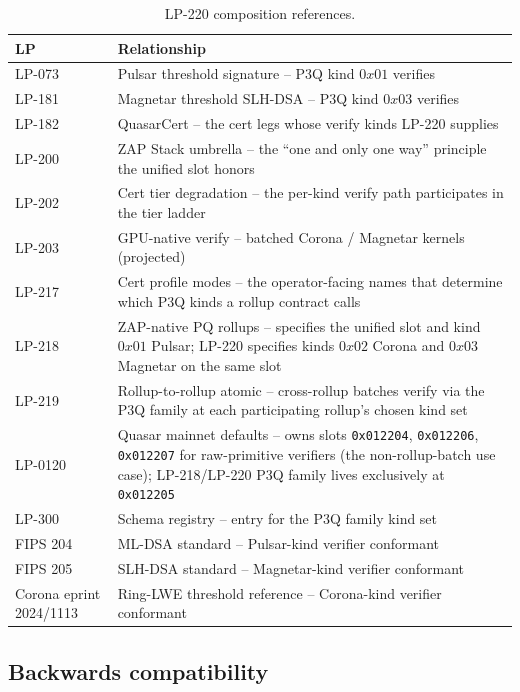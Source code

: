 \begin{table}[h]
\centering
\small
\begin{tabular}{@{}lp{9cm}@{}}
\toprule
\textbf{LP} & \textbf{Relationship} \\
\midrule
LP-073 & Pulsar threshold signature -- P3Q kind $0x01$ verifies \\
LP-181 & Magnetar threshold SLH-DSA -- P3Q kind $0x03$ verifies \\
LP-182 & QuasarCert -- the cert legs whose verify kinds LP-220 supplies \\
LP-200 & ZAP Stack umbrella -- the ``one and only one way'' principle the unified slot honors \\
LP-202 & Cert tier degradation -- the per-kind verify path participates in the tier ladder \\
LP-203 & GPU-native verify -- batched Corona / Magnetar kernels (projected) \\
LP-217 & Cert profile modes -- the operator-facing names that determine which P3Q kinds a rollup contract calls \\
LP-218 & ZAP-native PQ rollups -- specifies the unified slot and kind $0x01$ Pulsar; LP-220 specifies kinds $0x02$ Corona and $0x03$ Magnetar on the same slot \\
LP-219 & Rollup-to-rollup atomic -- cross-rollup batches verify via the P3Q family at each participating rollup's chosen kind set \\
LP-0120 & Quasar mainnet defaults -- owns slots \texttt{0x012204},
  \texttt{0x012206}, \texttt{0x012207} for raw-primitive verifiers
  (the non-rollup-batch use case); LP-218/LP-220 P3Q family
  lives exclusively at \texttt{0x012205} \\
LP-300 & Schema registry -- entry for the P3Q family kind set \\
FIPS 204 & ML-DSA standard -- Pulsar-kind verifier conformant \\
FIPS 205 & SLH-DSA standard -- Magnetar-kind verifier conformant \\
Corona eprint 2024/1113 & Ring-LWE threshold reference -- Corona-kind verifier conformant \\
\bottomrule
\end{tabular}
\caption{LP-220 composition references.}
\label{tab:composition-refs}
\end{table}

\subsection{Backwards compatibility}

